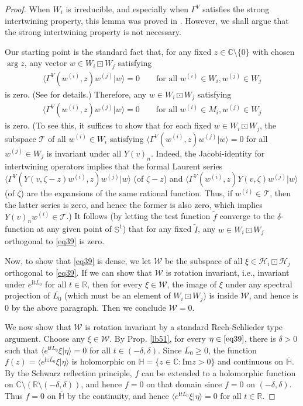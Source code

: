 \documentclass[11pt,b5paper,notitlepage]{article}
\theoremstyle{definition}
\theoremstyle{plain}
\newcommand{\mc}{\mathcal}
\newcommand{\wtd}{\widetilde}
\newcommand{\ovl}{\overline}
\newcommand{\bk}[1]{\langle {#1}\rangle}
\newcommand{\im}{\mathbf{i}}
\newcommand{\mbb}{\mathbb}
\newcommand{\Cbb}{\mathbb C}
\newcommand{\Rbb}{\mathbb R}
\newcommand{\Hbb}{\mathbb H}
\newcommand{\Sbb}{{\mathbb S}}
\newcommand{\Imag}{\mathrm{Im}}
\numberwithin{equation}{section}
\begin{document}
\begin{proof}
When $W_i$ is irreducible, and especially when $\Gamma^V$ satisfies the strong intertwining property, this lemma was proved in \cite[Prop. 4.12]{Gui21a}. However, we shall argue that the strong intertwining property is not necessary.

Our starting point is the standard fact that, for any fixed $z\in\Cbb\setminus\{0\}$ with chosen $\arg z$,  any vector $w\in W_i\boxdot W_j$ satisfying
\begin{align}
\bk{\Gamma^V(w^{(i)},z)w^{(j)}|w}=0\qquad\text{for all }w^{(i)}\in W_i,w^{(j)}\in W_j
\end{align}
is zero. (See \cite[Prop. A.3]{Gui19a} for details.) Therefore, any $w\in W_i\boxdot W_j$ satisfying
\begin{align}
\bk{\Gamma^V(w^{(i)},z)w^{(j)}|w}=0\qquad\text{for all }w^{(i)}\in M_i,w^{(j)}\in W_j
\end{align}
is zero. (To see this, it suffices to show that for each fixed $w\in W_i\boxdot W_j$, the subspace $\mc T$ of all $w^{(i)}\in W_i$ satisfying $\bk{\Gamma^V(w^{(i)},z)w^{(j)}|w}=0$ for all $w^{(j)}\in W_j$ is invariant under all $Y(v)_n$. Indeed, the Jacobi-identity for intertwining operators implies that the formal Laurent series $\bk{\Gamma^V(Y(v,\zeta-z)w^{(i)},z)w^{(j)}|w}$ (of $\zeta-z$) and $\bk{\Gamma^V(w^{(i)},z)Y(v,\zeta)w^{(j)}|w}$ (of $\zeta$) are the expansions of the same rational function. Thus, if $w^{(i)}\in\mc T$, then the latter series is zero, and hence the former is also zero, which implies $Y(v)_nw^{(i)}\in\mc T$.) It follows (by letting the test function $\wtd f$ converge to the $\delta$-function at any given point of $\Sbb^1$) that for any fixed $\wtd I$, any $w\in W_i\boxdot W_j$ orthogonal to \eqref{eq39} is zero.

Now, to show that \eqref{eq39} is dense, we let $\mc W$ be the subspace of all $\xi\in\mc H_i\boxdot\mc H_j$ orthogonal to \eqref{eq39}. If we can show that $\mc W$ is rotation invariant, i.e., invariant under $e^{\im t\ovl{L_0}}$ for all $t\in\Rbb$, then for every $\xi\in\mc W$, the image of $\xi$ under any spectral projection of $\ovl{L_0}$ (which must be an element of $W_i\boxdot W_j$) is inside $\mc W$, and hence is $0$ by the above paragraph. Then we conclude $\mc W=0$.

We now show that $\mc W$ is rotation invariant by a standard Reeh-Schlieder type argument. Choose any $\xi\in\mc W$. By Prop. \ref{lb51}, for every $\eta\in\eqref{eq39}$, there is $\delta>0$ such that $\bk{e^{\im t\ovl{L_0}}\xi|\eta}=0$ for all $t\in(-\delta,\delta)$. Since $\ovl{L_0}\geq0$,  the function $f(z)=\bk{e^{\im z\ovl{L_0}}\xi|\eta}$ is holomorphic on $\mbb H=\{z\in\Cbb:\Imag z>0\}$ and continuous on $\ovl{\Hbb}$. By the Schwarz reflection principle, $f$ can be extended to a holomorphic function on $\Cbb\setminus(\Rbb\setminus(-\delta,\delta))$, and hence $f=0$ on that domain since $f=0$ on $(-\delta,\delta)$. Thus $f=0$ on $\ovl{\Hbb}$ by the continuity, and hence $\bk{e^{\im t\ovl{L_0}}\xi|\eta}=0$ for all $t\in\Rbb$. 
\end{proof}
\end{document}
